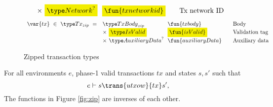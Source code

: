 \begin{property}
\begin{figure*}[htb]
\begin{equation*}
\begin{array}{r@{~~}l@{~~}l@{\qquad}l}
       & \times ~\hldiff{\Network^?} & \hldiff{\fun{txnetworkid}} & \text{Tx network ID}\\
    \end{array}
  \end{equation*}
  \begin{equation*}
    \begin{array}{r@{~~}l@{~~}l@{\qquad}l}
      \var{tx} ~\in~ \Tx_{zip} ~=~
      & \TxBody_{zip} & \fun{txbody} & \text{Body}\\
      & \times ~\hldiff{\IsValid} & \hldiff{\fun{isValid}}&\text{Validation tag}\\
      & \times ~\AuxiliaryData^? & \fun{auxiliaryData}&\text{Auxiliary data}\\
    \end{array}
  \end{equation*}
  \caption{Zipped transaction types}
  \label{fig:zipped-types}
\end{figure*}

\begin{lemma}
  For all environments $e$, phase-1 valid transactions $tx$ and states $s, s'$ such that
  \begin{equation*}
    e\vdash s\trans{utxow}{tx}s',
  \end{equation*}
  The functions in Figure \ref{fig:zip} are inverses of each other.


\end{lemma}
\end{property}
